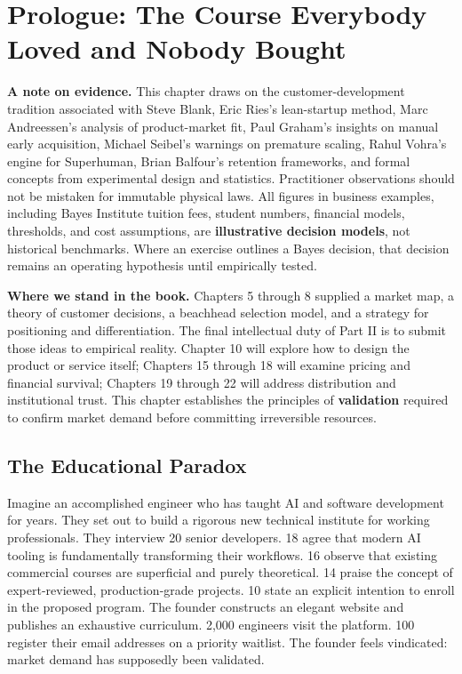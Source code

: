 \section*{Prologue: The Course Everybody Loved and Nobody Bought}

\textbf{A note on evidence.} This chapter draws on the customer-development tradition associated with Steve Blank, Eric Ries's lean-startup method, Marc Andreessen's analysis of product-market fit, Paul Graham's insights on manual early acquisition, Michael Seibel's warnings on premature scaling, Rahul Vohra's engine for Superhuman, Brian Balfour's retention frameworks, and formal concepts from experimental design and statistics. Practitioner observations should not be mistaken for immutable physical laws. All figures in business examples, including Bayes Institute tuition fees, student numbers, financial models, thresholds, and cost assumptions, are \textbf{illustrative decision models}, not historical benchmarks. Where an exercise outlines a Bayes decision, that decision remains an operating hypothesis until empirically tested.

\textbf{Where we stand in the book.} Chapters 5 through 8 supplied a market map, a theory of customer decisions, a beachhead selection model, and a strategy for positioning and differentiation. The final intellectual duty of Part II is to submit those ideas to empirical reality. Chapter 10 will explore how to design the product or service itself; Chapters 15 through 18 will examine pricing and financial survival; Chapters 19 through 22 will address distribution and institutional trust. This chapter establishes the principles of \textbf{validation} required to confirm market demand before committing irreversible resources.

\subsection*{The Educational Paradox}

Imagine an accomplished engineer who has taught AI and software development for years. They set out to build a rigorous new technical institute for working professionals. They interview 20 senior developers. 18 agree that modern AI tooling is fundamentally transforming their workflows. 16 observe that existing commercial courses are superficial and purely theoretical. 14 praise the concept of expert-reviewed, production-grade projects. 10 state an explicit intention to enroll in the proposed program. The founder constructs an elegant website and publishes an exhaustive curriculum. 2,000 engineers visit the platform. 100 register their email addresses on a priority waitlist. The founder feels vindicated: market demand has supposedly been validated.

